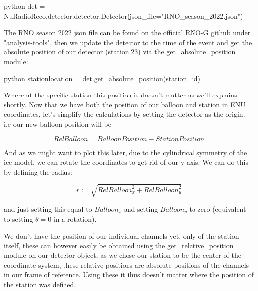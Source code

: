 \documentclass[11pt,a4paper,faculty=we,language=en,doctype=report]{cls/ugent-doc}
\begin{document}
\begin{mintedbox}{python}
det = NuRadioReco.detector.detector.Detector(json_file="RNO_season_2022.json")
\end{mintedbox}

The RNO season 2022 json file can be found on the official RNO-G github under
"analysis-tools", then we update the detector to the time of the event and get
the absolute position of our detector (station 23) via the
get\_absolute\_position module:

\begin{mintedbox}{python}
	stationlocation = det.get_absolute_position(station_id)
\end{mintedbox}

Where at the specific station this position is doesn't matter as we'll explains
shortly.  Now that we have both the position of our balloon and station in ENU
coordinates, let's simplify the calculations by setting the detector as the
origin.  i.e our new balloon position will be

\begin{equation}
	\textit{RelBalloon} = \textit{BalloonPosition} - \textit{StationPosition}
\end{equation}

And as we might want to plot this later, due to the cylindrical symmetry of the
ice model, we can rotate the coordinates to get rid of our y-axis. We can do
this by defining the radius:

\begin{equation}
	r := \sqrt{\textit{RelBalloon}_x^2 + \textit{RelBalloon}_y^2}
\end{equation}

and just setting this equal to $\textit{Balloon}_x$ and setting $\textit{Balloon}_y$ to
zero (equivalent to setting $\theta= 0$ in a rotation).

We don't have the position of our individual channels yet, only of the
station itself, these can however easily be obtained using the
get\_relative\_position module on our detector object, as we chose our station
to be the center of the coordinate system, these relative positions are
absolute positions of the channels in our frame of reference. Using
these it thus doesn't matter where the position of the station was defined.
\end{document}
